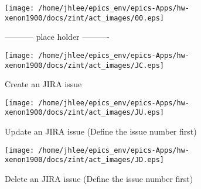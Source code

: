 \noindent
\vspace{1.4cm}
\begin{minipage}{.2\textwidth}
\begin{center}
\texttt{[image: /home/jhlee/epics\_env/epics-Apps/hw-xenon1900/docs/zint/act\_images/00.eps]}
\end{center}
\end{minipage}
\begin{minipage}{.7\textwidth}
----------- place holder ----------
\end{minipage}


\noindent
\vspace{1.4cm}
\begin{minipage}{.2\textwidth}
\begin{center}
\texttt{[image: /home/jhlee/epics\_env/epics-Apps/hw-xenon1900/docs/zint/act\_images/JC.eps]}
\end{center}
\end{minipage}
\begin{minipage}{.7\textwidth}
Create an JIRA issue 
\end{minipage}


\noindent
\vspace{1.4cm}
\begin{minipage}{.2\textwidth}
\begin{center}
\texttt{[image: /home/jhlee/epics\_env/epics-Apps/hw-xenon1900/docs/zint/act\_images/JU.eps]}
\end{center}
\end{minipage}
\begin{minipage}{.7\textwidth}
Update an JIRA issue (Define the issue number first)
\end{minipage}


\noindent
\vspace{1.4cm}
\begin{minipage}{.2\textwidth}
\begin{center}
\texttt{[image: /home/jhlee/epics\_env/epics-Apps/hw-xenon1900/docs/zint/act\_images/JD.eps]}
\end{center}
\end{minipage}
\begin{minipage}{.7\textwidth}
Delete an JIRA issue (Define the issue number first)
\end{minipage}



